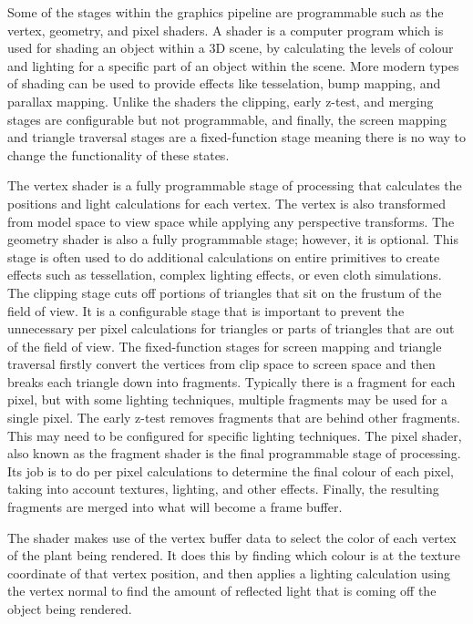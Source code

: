 \noindent
Some of the stages within the graphics pipeline are programmable such as the vertex, geometry, and pixel shaders. A shader is a computer program which is used for shading an object within a 3D scene, by calculating the levels of colour and lighting for a specific part of an object within the scene. More modern types of shading can be used to provide effects like tesselation, bump mapping, and parallax mapping. Unlike the shaders the clipping, early z-test, and merging stages are configurable but not programmable, and finally, the screen mapping and triangle traversal stages are a fixed-function stage meaning there is no way to change the functionality of these states.

The vertex shader is a fully programmable stage of processing that calculates the positions and light calculations for each vertex. The vertex is also transformed from model space to view space while applying any perspective transforms. The geometry shader is also a fully programmable stage; however, it is optional. This stage is often used to do additional calculations on entire primitives to create effects such as tessellation, complex lighting effects, or even cloth simulations. The clipping stage cuts off portions of triangles that sit on the frustum of the field of view. It is a configurable stage that is important to prevent the unnecessary per pixel calculations for triangles or parts of triangles that are out of the field of view. The fixed-function stages for screen mapping and triangle traversal firstly convert the vertices from clip space to screen space and then breaks each triangle down into fragments. Typically there is a fragment for each pixel, but with some lighting techniques, multiple fragments may be used for a single pixel. The early z-test removes fragments that are behind other fragments. This may need to be configured for specific lighting techniques. The pixel shader, also known as the fragment shader is the final programmable stage of processing. Its job is to do per pixel calculations to determine the final colour of each pixel, taking into account textures, lighting, and other effects. Finally, the resulting fragments are merged into what will become a frame buffer.

The shader makes use of the vertex buffer data to select the color of each vertex of the plant being rendered. It does this by finding which colour is at the texture coordinate of that vertex position, and then applies a lighting calculation using the vertex normal to find the amount of reflected light that is coming off the object being rendered. 


